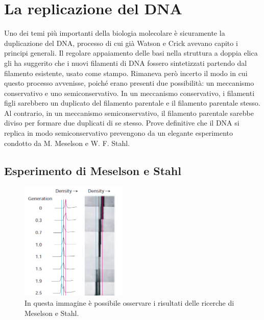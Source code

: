 \documentclass[11pt]{report}
\begin{document}
	\chapter{La replicazione del DNA}
	
	Uno dei temi più importanti della biologia molecolare è sicuramente la duplicazione del DNA, processo di cui già Watson e Crick avevano capito i principi generali. Il regolare appaiamento delle basi nella struttura a doppia elica gli ha suggerito che i nuovi filamenti di DNA fossero sintetizzati partendo dal filamento esistente, usato come stampo. Rimaneva però incerto il modo in cui questo processo avvenisse, poiché erano presenti due possibilità: un meccanismo conservativo e uno semiconservativo. In un meccanismo conservativo, i filamenti figli sarebbero un duplicato del filamento parentale e il filamento parentale stesso. Al contrario, in un meccanismo semiconservativo, il filamento parentale sarebbe diviso per formare due duplicati di se stesso. Prove definitive che il DNA si replica in modo semiconservativo prevengono da un elegante esperimento condotto da M. Meselson e W. F. Stahl.
	
	\section{Esperimento di Meselson e Stahl}
	
	\begin{figure}
		\includegraphics[width=2in]{esperimento-meselson.png}
		\caption{{\small In questa immagine è possibile osservare i risultati delle ricerche di Meselson e Stahl.\cite{lodish2008molecular}}}
	\end{figure}
	
\end{document}
